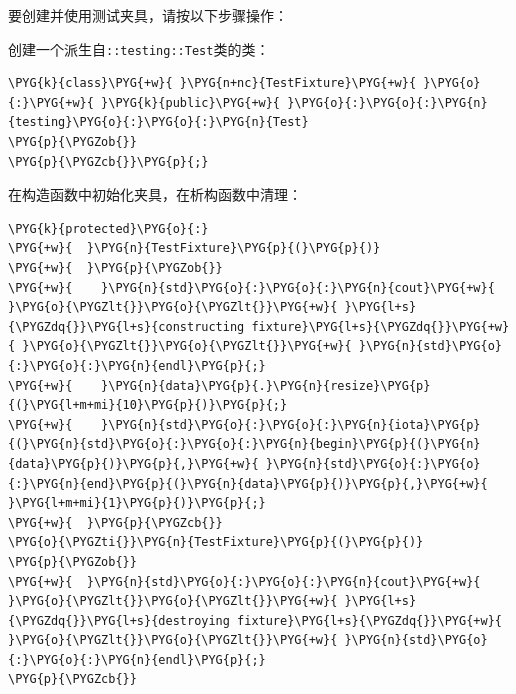 要创建并使用测试夹具，请按以下步骤操作：



创建一个派生自\texttt{::\allowbreak{}testing::\allowbreak{}Test}类的类：



\begin{codeblockbg}
\begin{Verbatim}[commandchars=\\\{\},breaklines=true,breakanywhere=true,fontsize=\codefont,xleftmargin=17bp]
\PYG{k}{class}\PYG{+w}{ }\PYG{n+nc}{TestFixture}\PYG{+w}{ }\PYG{o}{:}\PYG{+w}{ }\PYG{k}{public}\PYG{+w}{ }\PYG{o}{:}\PYG{o}{:}\PYG{n}{testing}\PYG{o}{:}\PYG{o}{:}\PYG{n}{Test}
\PYG{p}{\PYGZob{}}
\PYG{p}{\PYGZcb{}}\PYG{p}{;}
\end{Verbatim}
\end{codeblockbg}



在构造函数中初始化夹具，在析构函数中清理：



\begin{codeblockbg}
\begin{Verbatim}[commandchars=\\\{\},breaklines=true,breakanywhere=true,fontsize=\codefont,xleftmargin=17bp]
\PYG{k}{protected}\PYG{o}{:}
\PYG{+w}{  }\PYG{n}{TestFixture}\PYG{p}{(}\PYG{p}{)}
\PYG{+w}{  }\PYG{p}{\PYGZob{}}
\PYG{+w}{    }\PYG{n}{std}\PYG{o}{:}\PYG{o}{:}\PYG{n}{cout}\PYG{+w}{ }\PYG{o}{\PYGZlt{}}\PYG{o}{\PYGZlt{}}\PYG{+w}{ }\PYG{l+s}{\PYGZdq{}}\PYG{l+s}{constructing fixture}\PYG{l+s}{\PYGZdq{}}\PYG{+w}{ }\PYG{o}{\PYGZlt{}}\PYG{o}{\PYGZlt{}}\PYG{+w}{ }\PYG{n}{std}\PYG{o}{:}\PYG{o}{:}\PYG{n}{endl}\PYG{p}{;}
\PYG{+w}{    }\PYG{n}{data}\PYG{p}{.}\PYG{n}{resize}\PYG{p}{(}\PYG{l+m+mi}{10}\PYG{p}{)}\PYG{p}{;}
\PYG{+w}{    }\PYG{n}{std}\PYG{o}{:}\PYG{o}{:}\PYG{n}{iota}\PYG{p}{(}\PYG{n}{std}\PYG{o}{:}\PYG{o}{:}\PYG{n}{begin}\PYG{p}{(}\PYG{n}{data}\PYG{p}{)}\PYG{p}{,}\PYG{+w}{ }\PYG{n}{std}\PYG{o}{:}\PYG{o}{:}\PYG{n}{end}\PYG{p}{(}\PYG{n}{data}\PYG{p}{)}\PYG{p}{,}\PYG{+w}{ }\PYG{l+m+mi}{1}\PYG{p}{)}\PYG{p}{;}
\PYG{+w}{  }\PYG{p}{\PYGZcb{}}
\PYG{o}{\PYGZti{}}\PYG{n}{TestFixture}\PYG{p}{(}\PYG{p}{)}
\PYG{p}{\PYGZob{}}
\PYG{+w}{  }\PYG{n}{std}\PYG{o}{:}\PYG{o}{:}\PYG{n}{cout}\PYG{+w}{ }\PYG{o}{\PYGZlt{}}\PYG{o}{\PYGZlt{}}\PYG{+w}{ }\PYG{l+s}{\PYGZdq{}}\PYG{l+s}{destroying fixture}\PYG{l+s}{\PYGZdq{}}\PYG{+w}{ }\PYG{o}{\PYGZlt{}}\PYG{o}{\PYGZlt{}}\PYG{+w}{ }\PYG{n}{std}\PYG{o}{:}\PYG{o}{:}\PYG{n}{endl}\PYG{p}{;}
\PYG{p}{\PYGZcb{}}
\end{Verbatim}
\end{codeblockbg}


